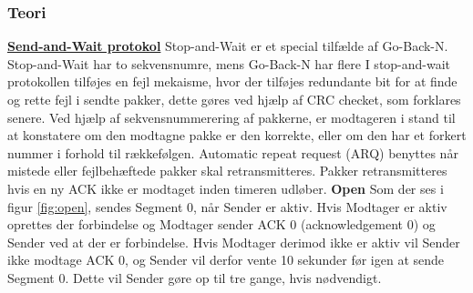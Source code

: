 \subsubsection{Teori}
\underline{\textbf{Send-and-Wait protokol}}
\newline
Stop-and-Wait er et special tilfælde af Go-Back-N.
Stop-and-Wait har to sekvensnumre, mens Go-Back-N har flere
\newline
I stop-and-wait protokollen tilføjes en fejl mekaisme, hvor der tilføjes redundante bit for at finde og rette fejl i sendte pakker, dette gøres ved hjælp af CRC checket, som forklares senere.
\newline
Ved hjælp af sekvensnummerering af pakkerne, er modtageren i stand til at konstatere om den modtagne pakke er den korrekte, eller om den har et forkert nummer i forhold til rækkefølgen.
\newline
Automatic repeat request (ARQ) benyttes når mistede eller fejlbehæftede pakker skal retransmitteres. Pakker retransmitteres hvis en ny ACK ikke er modtaget inden timeren udløber.
\newline
\textbf{Open}
\newline
Som der ses i figur \ref{fig:open}, sendes Segment 0, når Sender er aktiv. Hvis Modtager er aktiv oprettes der forbindelse og Modtager sender ACK 0 (acknowledgement 0) og Sender ved at der er forbindelse.
\newline
Hvis Modtager derimod ikke er aktiv vil Sender ikke modtage ACK 0, og Sender vil derfor vente 10 sekunder før igen at sende Segment 0. Dette vil Sender gøre op til tre gange, hvis nødvendigt.

